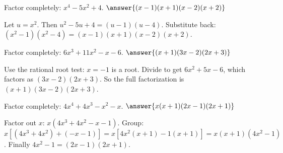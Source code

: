 \documentclass{ximera}
\begin{document}
\begin{problem}
Factor completely: \(x^4 - 5x^2 + 4\). $\answer{(x-1)(x+1)(x-2)(x+2)}$
\begin{feedback}
Let \(u=x^2\). Then \(u^2-5u+4=(u-1)(u-4)\). Substitute back: \((x^2-1)(x^2-4)=(x-1)(x+1)(x-2)(x+2)\).
\end{feedback}
\end{problem}

\begin{problem}
Factor completely: \(6x^3 + 11x^2 - x - 6\). $\answer{(x+1)(3x-2)(2x+3)}$
\begin{feedback}
Use the rational root test: \(x=-1\) is a root. Divide to get \(6x^2+5x-6\), which factors as \((3x-2)(2x+3)\). So the full factorization is \((x+1)(3x-2)(2x+3)\).
\end{feedback}
\end{problem}

\begin{problem}
Factor completely: \(4x^4 + 4x^3 - x^2 - x\). $\answer{x(x+1)(2x-1)(2x+1)}$
\begin{feedback}
Factor out \(x\): \(x(4x^3+4x^2-x-1)\). Group: \(x[(4x^3+4x^2)+(-x-1)]=x[4x^2(x+1)-1(x+1)]=x(x+1)(4x^2-1)\). Finally \(4x^2-1=(2x-1)(2x+1)\).
\end{feedback}
\end{problem}
\end{document}
